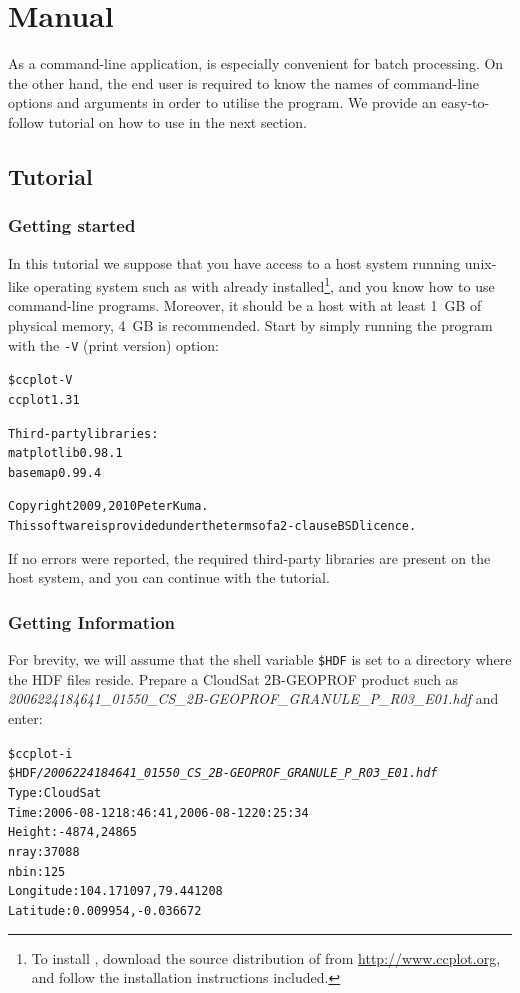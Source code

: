\chapter{\ccplot Manual}\label{chap:ccplot-manual}
As a command-line application, \ccplot is especially convenient for batch
processing. On the other hand, the end user is required to know the names of
command-line options and arguments in order to utilise the program. We provide
an easy-to-follow tutorial on how to use \ccplot in the next section.

\section{Tutorial}
\subsection{Getting started}
In this tutorial we suppose that you have access to a host system running
unix-like operating system such as  with \ccplot
already installed\footnote{To install \ccplot, download the source
distribution of \ccplot from \url{http://www.ccplot.org}, and follow the installation
instructions
included.}, and you
know how to use command-line programs. Moreover, it should be a host with at
least \SI{1}{GB} of physical memory, \SI{4}{GB} is recommended. Start by simply running the
program with the \texttt{-V} (print version) option:

\begin{alltt}
\$ ccplot -V
ccplot 1.31

Third-party libraries:
matplotlib 0.98.1
basemap 0.99.4

Copyright 2009, 2010 Peter Kuma.
This software is provided under the terms of a 2-clause BSD licence.
\end{alltt}

\noindent If no errors were reported, the required third-party libraries are
present on the
host system, and you can continue with the tutorial.

\subsection{Getting Information}
For brevity, we will assume
that the shell variable \texttt{\$HDF} is set to a directory where the HDF files
reside.
Prepare a CloudSat 2B-GEOPROF product such as
\textit{2006224184641\_01550\_CS\_2B-GEOPROF\_GRANULE\_P\_R03\_E01.hdf} and
enter:


\begin{alltt}
\$ ccplot -i
\$HDF\textit{/2006224184641_01550_CS_2B-GEOPROF_GRANULE_P_R03_E01.hdf}
Type: CloudSat
Time: 2006-08-12 18:46:41, 2006-08-12 20:25:34
Height: -4874, 24865
nray: 37088
nbin: 125
Longitude: 104.171097, 79.441208
Latitude: 0.009954, -0.036672
\end{alltt}

